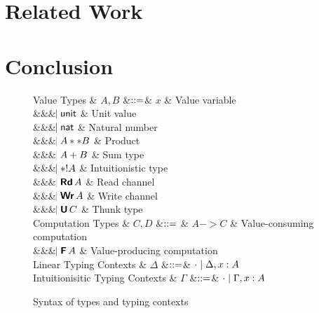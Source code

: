 \documentclass{llncs}
\begin{document}
\section{Related Work}

\section{Conclusion}




\appendix

\begin{figure}[htbp]
  \centering

\begin{grammar}
  Value Types
  & $A,B$
      &$\mathrel{::=}$&
      $x$ & Value variable
      \\ &&& $\hspace{-1.02ex}\mathrel{\mid} \mathsf{unit}$ & Unit value
      \\ &&& $\hspace{-1.02ex}\mathrel{\mid} \mathsf{nat}$         & Natural number
      \\ &&& $\hspace{-1.02ex}\mathrel{\mid} A ** B$ & Product
      \\ &&& $\hspace{-1.02ex}\mathrel{\mid} A + B$ & Sum type
      \\ &&& $\hspace{-1.02ex}\mathrel{\mid} *! A$ & Intuitionistic type
      \\ &&& $\bnfaltbrk \tyRd{A}$ & Read channel
      \\ &&& $\bnfaltbrk \tyWr{A}$ & Write channel
      \\ &&& $\bnfaltbrk \tyU{C}$ & Thunk type
  \\[1ex]
  Computation Types
  & $C, D$
      &$\mathrel{::=}$ & 
             $A -> C$ & Value-consuming computation
      \\ &&& $\bnfaltbrk \tyF{A}$ & Value-producing computation
  \\[1ex]
  Linear Typing Contexts
  & $\Delta$
     &$\mathrel{::=}$& $\cdot \mathrel{\mid} \Delta,x:A$
  \\
  Intuitionisitic Typing Contexts
  & $\Gamma$
     &$\mathrel{::=}$& $\cdot \mathrel{\mid} \Gamma,x:A$
\end{grammar}

  \caption{Syntax of types and typing contexts}
  \label{fig:expr}
\end{figure}
\end{document}
